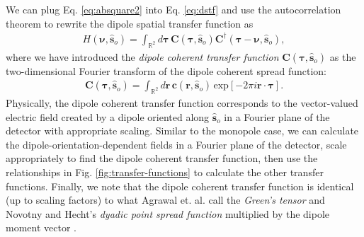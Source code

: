 \documentclass[]{osa-article}
\providecommand{\mb}[1]{\mathbf{#1}}
\providecommand{\so}{\mathbf{\hat{s}}_o}
\providecommand{\mbb}[1]{\mathbb{#1}}
\providecommand{\bs}[1]{\boldsymbol{#1}}
\providecommand{\bv}{\bs{\nu}}
\providecommand{\taup}{\bs{\tau}}
\begin{document}
We can plug Eq. \eqref{eq:absquare2} into Eq. \eqref{eq:dstf} and use the
autocorrelation theorem to rewrite the dipole spatial transfer function as
\begin{align}
  H(\bv, \so) = \int_{\mbb{R}^2}d\taup\,\mb{C}(\taup, \so)\mb{C}^\dagger(\taup - \bv, \so), 
\end{align}
where we have introduced the \textit{dipole coherent transfer function}
$\mb{C}(\taup, \so)$ as the two-dimensional Fourier transform of the dipole
coherent spread function:
\begin{align}
  \mb{C}(\taup, \so) = \int_{\mbb{R}^2}d\mb{r}\, \mb{c}(\mb{r}, \so)\,\text{exp}[-2\pi i\mb{r}\cdot\taup].
\end{align}
Physically, the dipole coherent transfer function corresponds to the
vector-valued electric field created by a dipole oriented along $\so$ in a
Fourier plane of the detector with appropriate scaling. Similar to the monopole
case, we can calculate the dipole-orientation-dependent fields in a Fourier
plane of the detector, scale appropriately to find the dipole coherent transfer
function, then use the relationships in Fig. \ref{fig:transfer-functions} to
calculate the other transfer functions. Finally, we note that the dipole
coherent transfer function is identical (up to scaling factors) to what
Agrawal et. al. call the \textit{Green's tensor} \cite{agrawal2012} and Novotny
and Hecht's \textit{dyadic point spread function} multiplied by the dipole
moment vector \cite{nov2006}.

\end{document}
